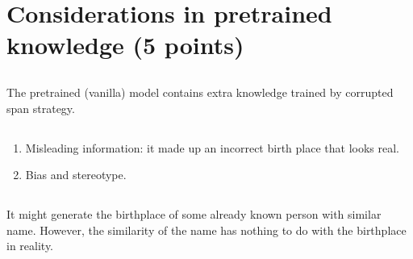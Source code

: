 \documentclass{homework}
\begin{document}
\section{Considerations in pretrained knowledge (5 points)}
\subsection{}
The pretrained (vanilla) model contains extra knowledge trained by corrupted span strategy.

\subsection{}
\begin{enumerate}
    \item Misleading information: it made up an incorrect birth place that looks real.
    \item Bias and stereotype.
\end{enumerate}

\subsection{}
It might generate the birthplace of some already known person with similar name. However, the similarity of the name has nothing to do with the birthplace in reality.
\end{document}
